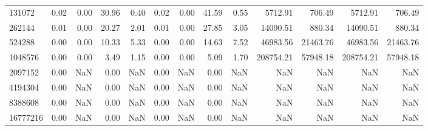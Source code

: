 \begin{tabular}{lrrrrrrrrrrrr}
131072 & 0.02 & 0.00 & 30.96 & 0.40 & 0.02 & 0.00 & 41.59 & 0.55 & 5712.91 & 706.49 & 5712.91 & 706.49 \\
262144 & 0.01 & 0.00 & 20.27 & 2.01 & 0.01 & 0.00 & 27.85 & 3.05 & 14090.51 & 880.34 & 14090.51 & 880.34 \\
524288 & 0.00 & 0.00 & 10.33 & 5.33 & 0.00 & 0.00 & 14.63 & 7.52 & 46983.56 & 21463.76 & 46983.56 & 21463.76 \\
1048576 & 0.00 & 0.00 & 3.49 & 1.15 & 0.00 & 0.00 & 5.09 & 1.70 & 208754.21 & 57948.18 & 208754.21 & 57948.18 \\
2097152 & 0.00 & NaN & 0.00 & NaN & 0.00 & NaN & 0.00 & NaN & NaN & NaN & NaN & NaN \\
4194304 & 0.00 & NaN & 0.00 & NaN & 0.00 & NaN & 0.00 & NaN & NaN & NaN & NaN & NaN \\
8388608 & 0.00 & NaN & 0.00 & NaN & 0.00 & NaN & 0.00 & NaN & NaN & NaN & NaN & NaN \\
16777216 & 0.00 & NaN & 0.00 & NaN & 0.00 & NaN & 0.00 & NaN & NaN & NaN & NaN & NaN \\
\bottomrule
\end{tabular}

